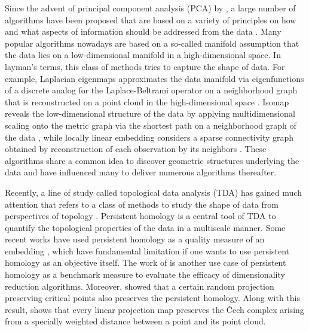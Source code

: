 \documentclass[11pt]{article}
\begin{document}
Since the advent of principal component analysis (PCA) by \cite{pearson_liii._1901}, a large number of algorithms have been proposed that are based on a variety of principles on how and what aspects of information should be addressed from the data \citep{you_rdimtools_2020}. Many popular algorithms nowadays are based on a so-called manifold assumption that the data lies on a low-dimensional manifold in a high-dimensional space. In layman's terms, this class of methods tries to capture the shape of data. For example, Laplacian eigenmaps approximates the data manifold via eigenfunctions of a discrete analog for the Laplace-Beltrami operator on a neighborhood graph that is reconstructed on a point cloud in the high-dimensional space \citep{belkin_laplacian_2001}. Isomap reveals the low-dimensional structure of the data by applying multidimensional scaling onto the metric graph via the shortest path on a neighborhood graph of the data \citep{tenenbaum_global_2000}, while locally linear embedding considers a sparse connectivity graph obtained by reconstruction of each observation by its neighbors \citep{roweis_nonlinear_2000}. These algorithms share a common idea to discover geometric structures underlying the data and have influenced many to deliver numerous algorithms thereafter. 

Recently, a line of study called topological data analysis (TDA) has gained much attention that refers to a class of methods to study the shape of data from perspectives of topology \citep{MR2549932, MR2572029, MR3328629}. Persistent homology is a central tool of TDA to quantify the topological properties of the data in a multiscale manner. Some recent works have used persistent homology as a quality measure of an embedding \citep{drevaluation, MR3822886, Bastian17}, which have fundamental limitation if one wants to use persistent homology as an objective itself. The work of \cite{PAUL2017160} is another use case of persistent homology as a benchmark measure to evaluate the efficacy of dimensionality reduction algorithms. Moreover, \cite{sheehy14persistent} showed that a certain random projection preserving critical points also preserves the persistent homology. Along with this result, \cite{aryaetal} shows that every linear projection map preserves the \v{C}ech complex arising from a specially weighted distance between a point and its point cloud. %
\end{document}
